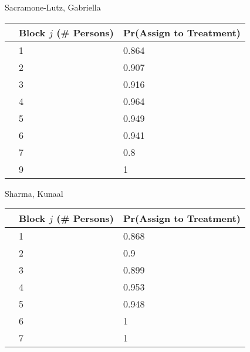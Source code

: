 \documentclass[11pt,notitlepage]{article}
\begin{document}
\begin{table}[h!]
\begin{center}
\begin{minipage}[t]{0.45\linewidth}\centering

Sacramone-Lutz, Gabriella

\begin{tabular}{rll}
  \hline
 & Block $j$ (\# Persons) & Pr(Assign to Treatment) \\ 
  \hline
  & 1 & 0.864 \\ 
  & 2 & 0.907 \\ 
  & 3 & 0.916 \\ 
  & 4 & 0.964 \\ 
  & 5 & 0.949 \\ 
  & 6 & 0.941 \\ 
  & 7 & 0.8 \\ 
  & 9 & 1 \\ 
   \hline
\end{tabular}

\end{minipage}
\hspace{0.5cm}
\begin{minipage}[t]{0.45\linewidth}\centering

Sharma, Kunaal

\begin{tabular}{rll}
  \hline
 & Block $j$ (\# Persons) & Pr(Assign to Treatment) \\ 
  \hline
   & 1 & 0.868 \\ 
   & 2 & 0.9 \\ 
   & 3 & 0.899 \\ 
   & 4 & 0.953 \\ 
   & 5 & 0.948 \\ 
   & 6 & 1 \\ 
   & 7 & 1 \\ 
   \hline
\end{tabular}

\end{minipage}

\end{center}
\end{table}
\end{document}
